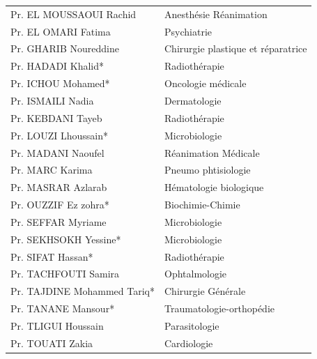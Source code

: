     \begin{table}[H]

      \begin{tabular}{l l}

    Pr. EL MOUSSAOUI Rachid	 & \hspace*{2em} Anesthésie Réanimation \\
     Pr. EL OMARI Fatima & \hspace*{2em} Psychiatrie \\
     Pr. GHARIB Noureddine & \hspace*{2em} Chirurgie plastique et réparatrice \\
     Pr. HADADI Khalid* & \hspace*{2em} Radiothérapie \\
     Pr. ICHOU Mohamed* & \hspace*{2em} Oncologie médicale \\
     Pr. ISMAILI Nadia & \hspace*{2em} Dermatologie\\
     Pr. KEBDANI Tayeb & \hspace*{2em} Radiothérapie \\
     Pr. LOUZI Lhoussain* & \hspace*{2em} Microbiologie\\
     Pr. MADANI Naoufel & \hspace*{2em} Réanimation Médicale\\
     Pr. MARC Karima & \hspace*{2em} Pneumo phtisiologie\\
     Pr. MASRAR Azlarab	 & \hspace*{2em} Hématologie biologique\\
     Pr. OUZZIF Ez zohra* & \hspace*{2em} Biochimie-Chimie \\
     Pr. SEFFAR Myriame & \hspace*{2em} Microbiologie\\
     Pr. SEKHSOKH Yessine* & \hspace*{2em} Microbiologie\\
     Pr. SIFAT Hassan* & \hspace*{2em} Radiothérapie\\
     Pr. TACHFOUTI Samira & \hspace*{2em} Ophtalmologie\\
     Pr. TAJDINE Mohammed Tariq* & \hspace*{2em} Chirurgie Générale\\
     Pr. TANANE Mansour* & \hspace*{2em} Traumatologie-orthopédie\\
     Pr. TLIGUI Houssain & \hspace*{2em} Parasitologie\\
     Pr. TOUATI Zakia & \hspace*{2em} Cardiologie\\
  
    
    \end{tabular}
    
  \end{table}

